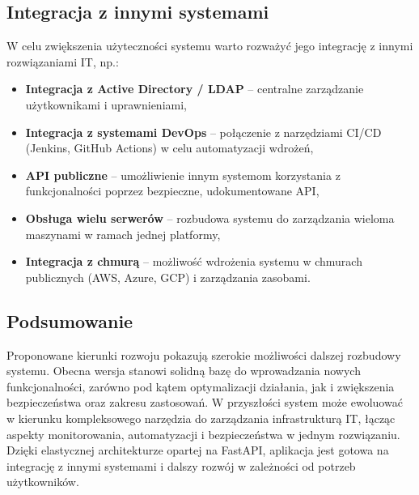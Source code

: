 \subsection{Integracja z innymi systemami}
W celu zwiększenia użyteczności systemu warto rozważyć jego integrację z innymi rozwiązaniami IT, np.:
\begin{itemize}
    \item \textbf{Integracja z Active Directory / LDAP} – centralne zarządzanie użytkownikami i uprawnieniami,
    \item \textbf{Integracja z systemami DevOps} – połączenie z narzędziami CI/CD (Jenkins, GitHub Actions) w celu automatyzacji wdrożeń,
    \item \textbf{API publiczne} – umożliwienie innym systemom korzystania z funkcjonalności poprzez bezpieczne, udokumentowane API,
    \item \textbf{Obsługa wielu serwerów} – rozbudowa systemu do zarządzania wieloma maszynami w ramach jednej platformy,
    \item \textbf{Integracja z chmurą} – możliwość wdrożenia systemu w chmurach publicznych (AWS, Azure, GCP) i zarządzania zasobami.
\end{itemize}

\subsection{Podsumowanie}
Proponowane kierunki rozwoju pokazują szerokie możliwości dalszej rozbudowy systemu. Obecna wersja stanowi solidną bazę do wprowadzania nowych funkcjonalności, zarówno pod kątem optymalizacji działania, jak i zwiększenia bezpieczeństwa oraz zakresu zastosowań. W przyszłości system może ewoluować w kierunku kompleksowego narzędzia do zarządzania infrastrukturą IT, łącząc aspekty monitorowania, automatyzacji i bezpieczeństwa w jednym rozwiązaniu. Dzięki elastycznej architekturze opartej na FastAPI, aplikacja jest gotowa na integrację z innymi systemami i dalszy rozwój w zależności od potrzeb użytkowników.